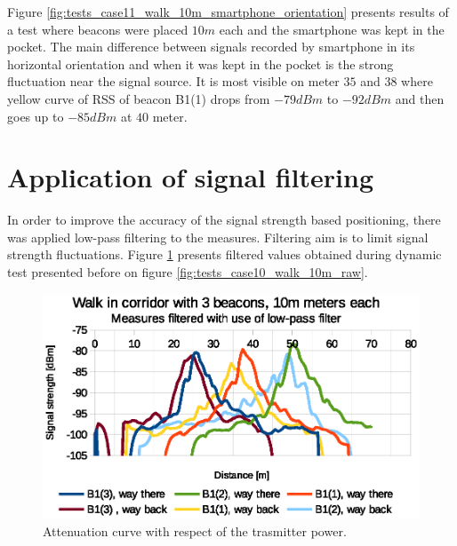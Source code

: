 \documentclass[../main.tex]{subfiles}
\begin{document}
Figure \ref{fig:tests_case11_walk_10m_smartphone_orientation} presents results of a test where beacons were placed $10m$ each and the smartphone was kept in the pocket. The main difference between signals recorded by smartphone in its horizontal orientation and when it was kept in the pocket is the strong fluctuation near the signal source. It is most visible on meter $35$ and $38$ where yellow curve of RSS of beacon B1(1) drops from $-79dBm$ to $-92dBm$ and then goes up to $-85dBm$ at $40$ meter.


\FloatBarrier

\section{Application of signal filtering} %
\label{sec:application_of_signal_filtering}

In order to improve the accuracy of the signal strength based positioning, there was applied low-pass filtering to the measures. Filtering aim is to limit signal strength fluctuations. Figure \ref{fig:tests_case10_walk_10m_low_pass} presents filtered values obtained during dynamic test presented before on figure \ref{fig:tests_case10_walk_10m_raw}.


\begin{figure}[!htbp]
\includegraphics[width=\textwidth, keepaspectratio]{pictures/tests_case10_walk_10m_low_pass}
\centering
\caption{Attenuation curve with respect of the trasmitter power.}
\label{fig:tests_case10_walk_10m_low_pass}
\end{figure}
\end{document}
